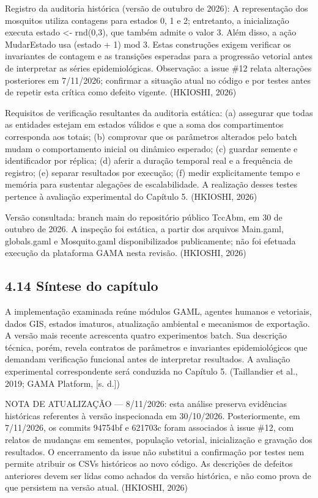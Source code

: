 Registro da auditoria histórica (versão de outubro de 2026): A
representação dos mosquitos utiliza contagens para estados 0, 1 e 2;
entretanto, a inicialização executa estado \textless- rnd(0,3), que
também admite o valor 3. Além disso, a ação MudarEstado usa (estado + 1)
mod 3. Estas construções exigem verificar os invariantes de contagem e
as transições esperadas para a progressão vetorial antes de interpretar
as séries epidemiológicas. Observação: a issue \#12 relata alterações
posteriores em 7/11/2026; confirmar a situação atual no código e por
testes antes de repetir esta crítica como defeito vigente. (HKIOSHI,
2026)

Requisitos de verificação resultantes da auditoria estática: (a)
assegurar que todas as entidades estejam em estados válidos e que a soma
dos compartimentos corresponda aos totais; (b) comprovar que os
parâmetros alterados pelo batch mudam o comportamento inicial ou
dinâmico esperado; (c) guardar semente e identificador por réplica; (d)
aferir a duração temporal real e a frequência de registro; (e) separar
resultados por execução; (f) medir explicitamente tempo e memória para
sustentar alegações de escalabilidade. A realização desses testes
pertence à avaliação experimental do Capítulo 5. (HKIOSHI, 2026)

Versão consultada: branch main do repositório público TccAbm, em 30 de
outubro de 2026. A inspeção foi estática, a partir dos arquivos
Main.gaml, globals.gaml e Mosquito.gaml disponibilizados publicamente;
não foi efetuada execução da plataforma GAMA nesta revisão. (HKIOSHI,
2026)

\subsection{4.14 Síntese do capítulo}\label{suxedntese-do-capuxedtulo-2}

A implementação examinada reúne módulos GAML, agentes humanos e
vetoriais, dados GIS, estados imaturos, atualização ambiental e
mecanismos de exportação. A versão mais recente acrescenta quatro
experimentos batch. Sua descrição técnica, porém, revela contratos de
parâmetros e invariantes epidemiológicos que demandam verificação
funcional antes de interpretar resultados. A avaliação experimental
correspondente será conduzida no Capítulo 5. (Taillandier et al., 2019;
GAMA Platform, {[}s. d.{]})

NOTA DE ATUALIZAÇÃO --- 8/11/2026: esta análise preserva evidências
históricas referentes à versão inspecionada em 30/10/2026.
Posteriormente, em 7/11/2026, os commits 94754bf e 621703c foram
associados à issue \#12, com relatos de mudanças em sementes, população
vetorial, inicialização e gravação dos resultados. O encerramento da
issue não substitui a confirmação por testes nem permite atribuir os
CSVs históricos ao novo código. As descrições de defeitos anteriores
devem ser lidas como achados da versão histórica, e não como prova de
que persistem na versão atual. (HKIOSHI, 2026)

